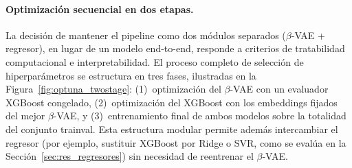 \paragraph{Optimización secuencial en dos etapas.} La decisión de mantener el pipeline como dos módulos separados ($\beta$-VAE + regresor), en lugar de un modelo end-to-end, responde a criterios de tratabilidad computacional e interpretabilidad. El proceso completo de selección de hiperparámetros se estructura en tres fases, ilustradas en la Figura~\ref{fig:optuna_twostage}: (1)~optimización del $\beta$-VAE con un evaluador XGBoost congelado, (2)~optimización del XGBoost con los embeddings fijados del mejor $\beta$-VAE, y (3)~entrenamiento final de ambos modelos sobre la totalidad del conjunto trainval. Esta estructura modular permite además intercambiar el regresor (por ejemplo, sustituir XGBoost por Ridge o SVR, como se evalúa en la Sección~\ref{sec:res_regresores}) sin necesidad de reentrenar el $\beta$-VAE.

